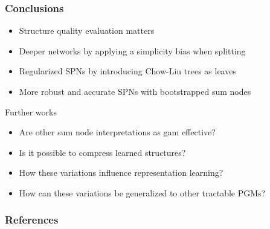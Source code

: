 \documentclass[xcolor={usenames,dvipsnames,svgnames}, compress]{beamer}
\begin{document}
\begin{frame}[t]
  \frametitle{Conclusions}
  \begin{itemize}
  \item Structure quality evaluation matters
  \item Deeper networks by applying a simplicity bias when splitting
  \item Regularized SPNs by introducing Chow-Liu trees as leaves
  \item More robust and accurate SPNs with bootstrapped sum nodes
  \end{itemize}\bigskip

  {
    Further works}\\[3pt]
  \begin{itemize}
    \item Are other sum node interpretations as gam effective?
  \item Is it possible to compress learned structures?
  \item How these variations influence representation learning?
    \item How can these variations be generalized to other tractable PGMs?
  \end{itemize}
  
\end{frame}

\begin{frame}
  \frametitle{References}
  \setlength\bibitemsep{8pt}
  \printbibliography
\end{frame}
\end{document}
